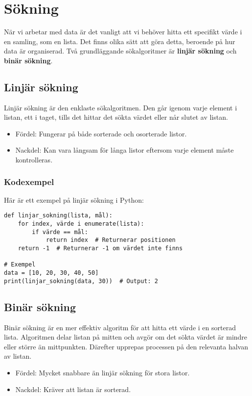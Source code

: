\section{Sökning}
\label{section:search}
När vi arbetar med data är det vanligt att vi behöver hitta ett specifikt värde i en samling, som en lista. Det finns olika sätt att göra detta, beroende på hur data är organiserad. Två grundläggande sökalgoritmer är \textbf{linjär sökning} och \textbf{binär sökning}.

\subsection{Linjär sökning}
Linjär sökning är den enklaste sökalgoritmen. Den går igenom varje element i listan, ett i taget, tills det hittar det sökta värdet eller når slutet av listan.

\begin{itemize}
    \item Fördel: Fungerar på både sorterade och osorterade listor.
    \item Nackdel: Kan vara långsam för långa listor eftersom varje element måste kontrolleras.
\end{itemize}

\subsubsection*{Kodexempel}
Här är ett exempel på linjär sökning i Python:
\begin{lstlisting}[title=Linjär sökning]
def linjar_sokning(lista, mål):
    for index, värde i enumerate(lista):
        if värde == mål:
            return index  # Returnerar positionen
    return -1  # Returnerar -1 om värdet inte finns

# Exempel
data = [10, 20, 30, 40, 50]
print(linjar_sokning(data, 30))  # Output: 2
\end{lstlisting}

\subsection{Binär sökning}
Binär sökning är en mer effektiv algoritm för att hitta ett värde i en sorterad lista. Algoritmen delar listan på mitten och avgör om det sökta värdet är mindre eller större än mittpunkten. Därefter upprepas processen på den relevanta halvan av listan.

\begin{itemize}
    \item Fördel: Mycket snabbare än linjär sökning för stora listor.
    \item Nackdel: Kräver att listan är sorterad.
\end{itemize}

